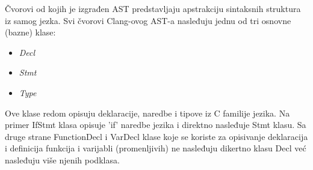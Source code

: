 \documentclass[12pt,oneside]{memoir}
\begin{document}
\v{C}vorovi od kojih je izgrađen AST predstavljaju apstrakciju sintaksnih struktura iz samog jezka.
Svi \v{c}vorovi Clang-ovog AST-a nasleđuju jednu od tri osnovne (bazne) klase:
\begin{itemize}
  \item \textit{Decl}
  \item \textit{Stmt}
  \item \textit{Type}
\end{itemize}
Ove klase redom opisuju deklaracije, naredbe i tipove iz C familije jezika.
Na primer IfStmt klasa opisuje 'if' naredbe jezika i direktno nasleđuje Stmt klasu. Sa druge strane FunctionDecl i VarDecl klase koje se koriste za opisivanje
deklaracija i definicija funkcija i varijabli (promenljivih) ne nasleđuju dikertno klasu Decl ve\'{c} nasleđuju vi\v{s}e njenih podklasa.
\end{document}
